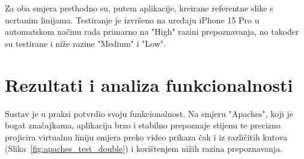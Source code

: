 Za oba smjera prethodno su, putem aplikacije, kreirane referentne slike s ucrtanim linijama. Testiranje je izvršeno na uređaju iPhone 15 Pro u automatskom načinu rada primarno na "High" razini prepoznavanja, no također su testirane i niže razine "Medium" i "Low".


\section{Rezultati i analiza funkcionalnosti}

Sustav je u praksi potvrdio svoju funkcionalnost. Na smjeru "Apaches", koji je bogat značajkama, aplikacija brzo i stabilno prepoznaje stijenu te precizno projicira virtualnu liniju smjera preko video prikaza čak i iz različitih kutova (Slika~\ref{fig:apaches_test_double}) i korištenjem nižih razina prepoznavanja.


